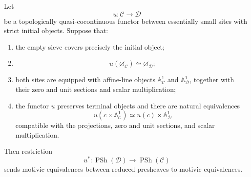 \begin{lemma}
\label{lem:motivic-quasi-cocontinuous-restriction}
Let
\[
    u
    \colon
    \mathcal C
    \longrightarrow
    \mathcal D
\]
be a topologically quasi-cocontinuous functor between essentially small
sites with strict initial objects.  Suppose that:
\begin{enumerate}[label=(\roman*)]
    \item the empty sieve covers precisely the initial object;

    \item
    \[
        u(\varnothing_{\mathcal C})
        \simeq
        \varnothing_{\mathcal D};
    \]

    \item both sites are equipped with affine-line objects
    \(\mathbb A^1_{\mathcal C}\) and
    \(\mathbb A^1_{\mathcal D}\), together with their zero and unit
    sections and scalar multiplication;

    \item the functor \(u\) preserves terminal objects and there are
    natural equivalences
    \[
        u(c\times\mathbb A^1_{\mathcal C})
        \simeq
        u(c)\times\mathbb A^1_{\mathcal D}
    \]
    compatible with the projections, zero and unit sections, and scalar
    multiplication.
\end{enumerate}
Then restriction
\[
    u^*
    \colon
    \operatorname{PSh}(\mathcal D)
    \longrightarrow
    \operatorname{PSh}(\mathcal C)
\]
sends motivic equivalences between reduced presheaves to motivic
equivalences.
\end{lemma}

